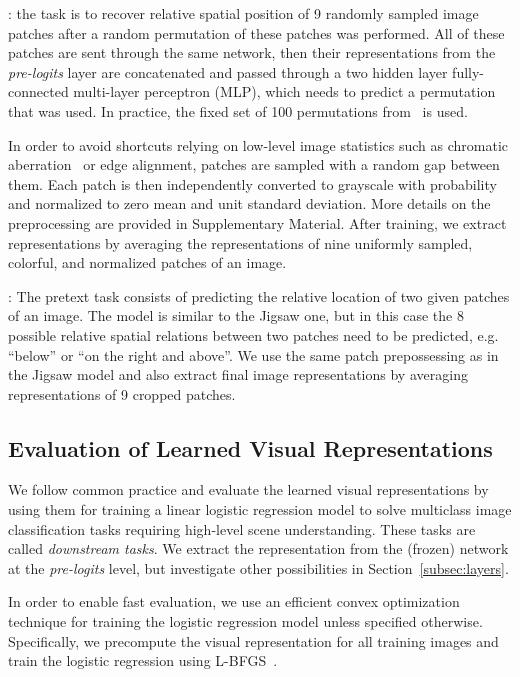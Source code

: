 \documentclass[10pt,twocolumn,letterpaper]{article}
\newcommand{\PAR}[1]{\vskip4pt \noindent {\bf #1~}}
\begin{document}
\PAR{Jigsaw}\cite{noroozi2016unsupervised}:
the task is to recover relative spatial position of 9 randomly sampled image patches after a random permutation of these patches was performed.
All of these patches are sent through the same network, then their representations from the \emph{pre-logits} layer are concatenated and passed through a two hidden layer fully-connected multi-layer perceptron (MLP), which needs to predict a permutation that was used.
In practice, the fixed set of 100 permutations from~\cite{noroozi2016unsupervised} is used.

In order to avoid shortcuts relying on low-level image statistics such as chromatic aberration~\cite{noroozi2016unsupervised} or edge alignment, patches are sampled with a random gap between them. Each patch is then independently 
converted to grayscale with probability  and
normalized to zero mean and unit standard deviation.
More details on the preprocessing are provided in Supplementary Material.
After training, we extract representations by averaging the representations of nine uniformly sampled, colorful, and normalized patches of an image.


\PAR{Relative Patch Location}\cite{doersch2015unsupervised}:
The pretext task consists of predicting the relative location of two given patches of an image.
The model is similar to the Jigsaw one, but in this case the 8 possible relative spatial relations between two patches need to be predicted, e.g. ``below'' or ``on the right and above''.
We use the same patch prepossessing as in the Jigsaw model and also extract
final image representations by averaging representations of 9 cropped patches.


\subsection{Evaluation of Learned Visual Representations}\label{subsec:eval}

We follow common practice and evaluate the learned visual representations
by using them for training a linear logistic regression model to solve multiclass image classification tasks requiring high-level scene understanding.
These tasks are called \emph{downstream tasks}.
We extract the representation from the (frozen) network at the \emph{pre-logits} level, but investigate other possibilities in Section~\ref{subsec:layers}.

In order to enable fast evaluation, we use an efficient convex optimization technique for training the logistic regression model unless specified otherwise.
Specifically, we precompute the visual representation for all training images and train the logistic regression using L-BFGS~\cite{liu1989limited}.
\end{document}
